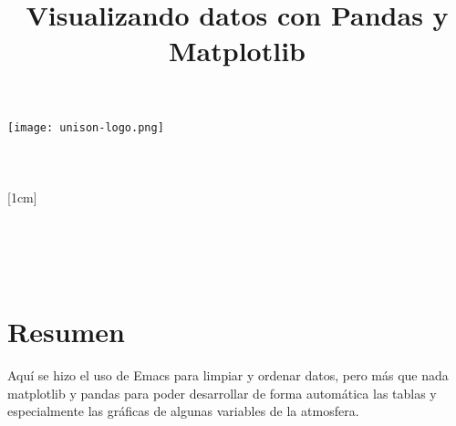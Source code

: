 \documentclass[a4paper,12pt]{article}
\title{Visualizando datos con Pandas y Matplotlib}
\author{}
\newcommand{\vacio}{\textcolor{white}{holacaracola}}
\newcommand{\director}{Carlos Lizárraga Celaya}
\begin{document}
\begin{titlepage}
\begin{center}
\vspace{1cm}

\texttt{[image: unison-logo.png]}
\\[0.5cm]
{\fontsize{24}{6}\selectfont{UNIVERSIDAD DE SONORA}}\\
[1em]
{\fontsize{16}{5}\selectfont{DEPARTAMENTO DE FÍSICA}}\\
[4em]
\textcolor{azulportada}
{\fontsize{30}{5}\selectfont{\textsc{\thetitle}}}\\
[1cm]
{\fontsize{16}{5}\selectfont{Alumno:}}\\
[0.2cm]
{\fontsize{14}{5}\selectfont{Luis Alfonso Torres Flores}}\\
[1cm]
{\fontsize{16}{5}\selectfont{Profesor}}\\
[0.2cm]
{\fontsize{16}{5}\selectfont{\director}}\\
[4.5cm]
{\fontsize{14}{5}\selectfont{27 de Febrero de 2017}}\\
[4cm]
\end{center}
\restoregeometry
\end{titlepage}

\newpage
\renewcommand{\headrulewidth}{0.5pt}
\fancyhead[L]{\vacio}

\newpage
\tableofcontents
\newpage
\section{Resumen}
\noindent
Aquí se hizo el uso de Emacs para limpiar y ordenar datos, pero más que nada matplotlib y pandas para poder desarrollar de forma automática las tablas y especialmente las gráficas de algunas variables de la atmosfera.
\end{document}
